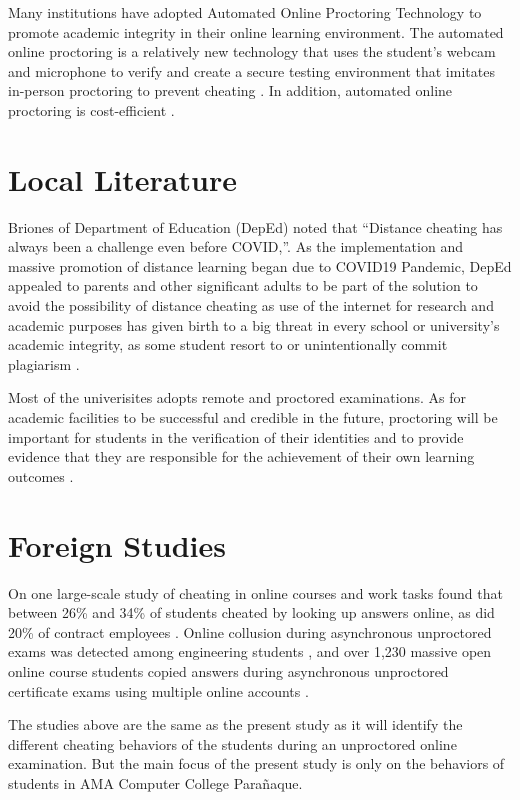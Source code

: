 Many institutions have adopted Automated Online Proctoring Technology to promote academic integrity in their online learning environment.
The automated online proctoring is a relatively new technology that uses the student’s webcam and microphone to verify and create a secure testing environment that imitates in-person proctoring to prevent cheating \cite{karim2014cheating}.
In addition, automated online proctoring is cost-efficient \cite{atoum2017automated,mitra2016biometrics}.

\section{Local Literature}

Briones of Department of Education (DepEd) noted that “Distance cheating has always been a challenge even before COVID,”.
As the implementation and massive promotion of distance learning began due to COVID19 Pandemic, DepEd appealed to parents and other significant adults to be part of the solution to avoid the possibility of distance cheating as use of the internet for research and academic purposes has given birth to a big threat in every school or university's academic integrity, as some student resort to or unintentionally commit plagiarism \cite{quieta2020plagiarism}.

Most of the univerisites adopts remote and proctored examinations.
As for academic facilities to be successful and credible in the future, proctoring will be important for students in the verification of their identities and to provide evidence that they are responsible for the achievement of their own learning outcomes \cite{dela2015massive}.

\section{Foreign Studies}

On one large-scale study of cheating in online courses and work tasks found that between 26\% and 34\% of students cheated by looking up answers online, as did 20\% of contract employees \cite{corrigan2015deterring}.
Online collusion during asynchronous unproctored exams was detected among engineering students \cite{de2015calculated}, and over 1,230 massive open online course students copied answers during asynchronous unproctored certificate exams using multiple online accounts \cite{northcutt2016detecting}.

The studies above are the same as the present study as it will identify the different cheating behaviors of the students during an unproctored online examination.
But the main focus of the present study is only on the behaviors of students in AMA Computer College Parañaque.

